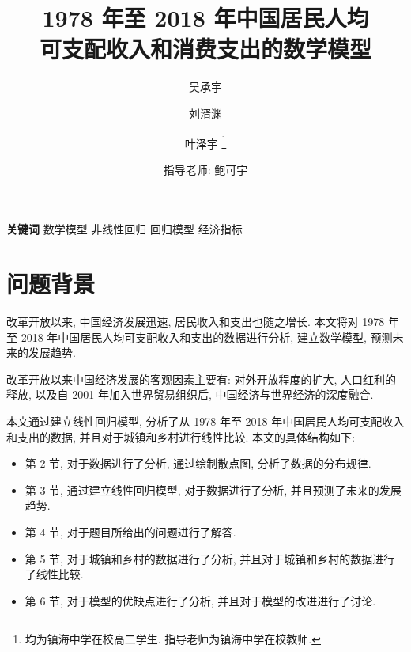 \documentclass{article}
\title{1978 年至 2018 年中国居民人均\\可支配收入和消费支出的数学模型}
\author{吴承宇 \and 刘湑渊 \and 叶泽宇 \thanks{均为镇海中学在校高二学生. 指导老师为镇海中学在校教师.}}
\date{指导老师: 鲍可宇}
\begin{document}
\maketitle
{}

\textbf{关键词} \quad 数学模型 \quad 非线性回归 \quad 回归模型 \quad 经济指标

\newpage

\tableofcontents

\newpage

\section{问题背景}
\par 改革开放以来, 中国经济发展迅速, 居民收入和支出也随之增长. 本文将对 1978 年至 2018 年中国居民人均可支配收入和支出的数据进行分析, 建立数学模型, 预测未来的发展趋势.\\
\par 改革开放以来中国经济发展的客观因素主要有: 对外开放程度的扩大, 人口红利的释放, 以及自 2001 年加入世界贸易组织后, 中国经济与世界经济的深度融合.\\
\par 本文通过建立线性回归模型, 分析了从 1978 年至 2018 年中国居民人均可支配收入和支出的数据, 并且对于城镇和乡村进行线性比较. 本文的具体结构如下:
\begin{itemize}
    \item 第 2 节, 对于数据进行了分析, 通过绘制散点图, 分析了数据的分布规律.
    \item 第 3 节, 通过建立线性回归模型, 对于数据进行了分析, 并且预测了未来的发展趋势.
    \item 第 4 节, 对于题目所给出的问题进行了解答.
    \item 第 5 节, 对于城镇和乡村的数据进行了分析, 并且对于城镇和乡村的数据进行了线性比较.
    \item 第 6 节, 对于模型的优缺点进行了分析, 并且对于模型的改进进行了讨论.
\end{itemize}
\end{document}
